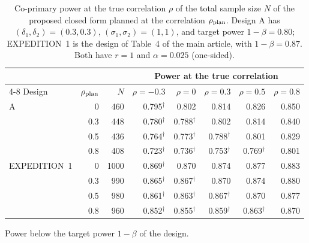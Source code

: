 \begin{table}[ht]
\centering
\footnotesize
\caption{Co-primary power at the true correlation $\rho$ of the total sample size $N$ of the proposed closed form planned at the correlation $\rho_{\rm plan}$. Design A has $(\delta_1, \delta_2) = (0.3, 0.3)$, $(\sigma_1, \sigma_2) = (1, 1)$, and target power $1 - \beta = 0.80$; EXPEDITION~1 is the design of Table~4 of the main article, with $1 - \beta = 0.87$. Both have $r = 1$ and $\alpha = 0.025$ (one-sided).}
\label{tab:planning_rho}
\begin{threeparttable}
\begin{tabular}{lrrrrrrr}
\hline
 & & & \multicolumn{5}{c}{Power at the true correlation} \\
\cline{4-8}
Design & $\rho_{\rm plan}$ & $N$ & $\rho = -0.3$ & $\rho = 0$ & $\rho = 0.3$ & $\rho = 0.5$ & $\rho = 0.8$ \\
\hline
A & 0 & 460 & 0.795$^{\dagger}$ & 0.802 & 0.814 & 0.826 & 0.850 \\
 & 0.3 & 448 & 0.780$^{\dagger}$ & 0.788$^{\dagger}$ & 0.802 & 0.814 & 0.840 \\
 & 0.5 & 436 & 0.764$^{\dagger}$ & 0.773$^{\dagger}$ & 0.788$^{\dagger}$ & 0.801 & 0.829 \\
 & 0.8 & 408 & 0.723$^{\dagger}$ & 0.736$^{\dagger}$ & 0.753$^{\dagger}$ & 0.769$^{\dagger}$ & 0.801 \\
\hline
EXPEDITION~1 & 0 & 1000 & 0.869$^{\dagger}$ & 0.870 & 0.874 & 0.877 & 0.883 \\
 & 0.3 & 990 & 0.865$^{\dagger}$ & 0.867$^{\dagger}$ & 0.870 & 0.874 & 0.880 \\
 & 0.5 & 980 & 0.861$^{\dagger}$ & 0.863$^{\dagger}$ & 0.867$^{\dagger}$ & 0.870 & 0.877 \\
 & 0.8 & 960 & 0.852$^{\dagger}$ & 0.855$^{\dagger}$ & 0.859$^{\dagger}$ & 0.863$^{\dagger}$ & 0.870 \\
\hline
\end{tabular}
\begin{tablenotes}
\footnotesize
\item[$\dagger$] Power below the target power $1 - \beta$ of the design.
\end{tablenotes}
\end{threeparttable}
\end{table}
